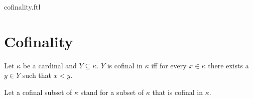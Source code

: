\documentclass{naproche-library}
\begin{document}
\begin{smodule}{cofinality.ftl}

  \section*{Cofinality}

  \begin{definition}[forthel,id=SET_THEORY_06_5621203645212879,printid]
    Let $\kappa$ be a cardinal and $Y \subseteq \kappa$.
    $Y$ is cofinal in $\kappa$ iff for every $x \in \kappa$ there exists a $y \in Y$ such that $x < y$.

    Let a cofinal subset of $\kappa$ stand for a subset of $\kappa$ that is cofinal in $\kappa$.
  \end{definition}
\end{smodule}
\end{document}
